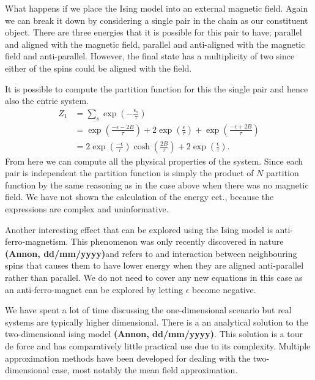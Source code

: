 \documentclass[a4paper]{article}
\def\citation{{\bfseries (Annon, dd/mm/yyyy)}}
\begin{document}
\begin{multicols}{2}
        What happens if we place the Ising model into an external magnetic %
        field. Again we can break it down by considering a single pair %
        in the chain as our constituent object. There are three energies %
        that it is possible for this pair to have; parallel and aligned %
        with the magnetic field, parallel and anti-aligned with the %
        magnetic field and anti-parallel. However, the final state has a %
        multiplicity of two since either of the spins could be aligned %
        with the field. 


        It is possible to compute the partition function for this the single %
        pair and hence also the entrie system.
        \begin{align}
            Z_{1} &= \sum_{s}\exp\left(-\frac{\epsilon_{s}}{\tau}\right)
                    \nonumber\\
                &= \exp\left(\frac{-\epsilon - 2B}{\tau}\right) +
                    2\exp\left(\frac{\epsilon}{\tau}\right) +
                    \exp\left(\frac{-\epsilon + 2B}{\tau}\right)
                    \nonumber\\
                &= 2\exp\left(\frac{-\epsilon}{\tau}\right)
                    \cosh\left(\frac{2B}{\tau}\right) + 
                    2\exp\left(\frac{\epsilon}{\tau}\right).
           \label{eqn:13}
        \end{align}
        From here we can compute all the physical properties of the system. %
        Since each pair is independent the partition function is simply the %
        product of \(N\) partition function by the same reasoning as in %
        the case above when there was no magnetic field. We have not shown %
        the calculation of the energy ect., because the expressions are %
        complex and uninformative. 


        Another interesting effect that can be explored using the Ising model %
        is anti-ferro-magnetism. This phenomenon was only recently discovered %
        in nature \citation and refers to and interaction between neighbouring %
        spins that causes them to have lower energy when they are aligned %
        anti-parallel rather than parallel. We do not need to cover any new %
        equations in this case as an anti-ferro-magnet can be explored by %
        letting \(\epsilon\) become negative. 


        We have spent a lot of time discussing the one-dimensional scenario %
        but real systems are typically higher dimensional. There is a %
        an analytical solution to the two-dimensional ising model \citation. %
        This solution is a tour de force and has comparatively little %
        practical use due to its complexity. Multiple approximation methods %
        have been developed for dealing with the two-dimensional case, %
        most notably the mean field approximation. 



\end{multicols}
\end{document}
